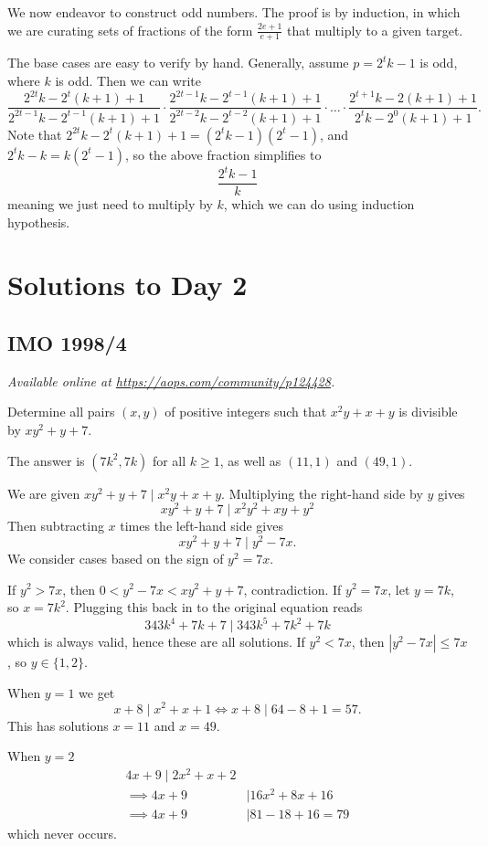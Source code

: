 \documentclass[11pt]{scrartcl}
\begin{document}
We now endeavor to construct odd numbers.
The proof is by induction, in which we are curating sets of
fractions of the form $\frac{2e+1}{e+1}$ that multiply
to a given target.

The base cases are easy to verify by hand.
Generally, assume $p = 2^t k - 1$ is odd, where $k$ is odd.
Then we can write
\[
  \frac{2^{2t}k-2^t(k+1)+1}{2^{2t-1}k-2^{t-1}(k+1)+1}
  \cdot
  \frac{2^{2t-1}k-2^{t-1}(k+1)+1}{2^{2t-2}k-2^{t-2}(k+1)+1}
  \cdot \dots \cdot
  \frac{2^{t+1}k-2(k+1)+1}{2^tk-2^0(k+1)+1}.
\]
Note that $2^{2t}k-2^t(k+1)+1 = (2^t k - 1)(2^t - 1)$,
and $2^t k - k = k(2^t-1)$, so the above fraction simplifies to
\[ \frac{2^t k - 1}{k} \]
meaning we just need to multiply by $k$,
which we can do using induction hypothesis.
\pagebreak

\section{Solutions to Day 2}
\subsection{IMO 1998/4}
\textsl{Available online at \url{https://aops.com/community/p124428}.}
\begin{mdframed}[style=mdpurplebox,frametitle={Problem statement}]
Determine all pairs $(x,y)$ of positive integers
such that $x^{2}y+x+y$ is divisible by $xy^{2}+y+7$.
\end{mdframed}
The answer is $(7k^2,7k)$ for all $k \ge 1$,
as well as $(11,1)$ and $(49,1)$.

We are given $xy^2+y+7 \mid x^2y+x+y$.
Multiplying the right-hand side by $y$ gives
\[ xy^2+y+7 \mid x^2y^2+xy+y^2 \]
Then subtracting $x$ times the left-hand side gives
\[ xy^2+y+7 \mid y^2-7x. \]
We consider cases based on the sign of $y^2=7x$.
\begin{itemize}
  \ii If $y^2 > 7x$, then $0 < y^2-7x < xy^2+y+7$,
  contradiction.
  \ii If $y^2=7x$, let $y = 7k$, so $x = 7k^2$.
  Plugging this back in to the original equation reads
  \[ 343k^4 + 7k + 7 \mid 343k^5 + 7k^2 + 7k \]
  which is always valid, hence these are all solutions.
  \ii  If $y^2 < 7x$, then $|y^2-7x| \le 7x$,
  so $y \in \{1,2\}$.

  When $y=1$ we get
  \[ x+8 \mid x^2+x+1 \iff x+8 \mid 64-8+1=57.\]
  This has solutions $x=11$ and $x=49$.

  When $y=2$
  \begin{align*}
    4x+9 \mid 2x^2+x+2 \\
    \implies 4x+9 &\mid 16x^2+8x+16 \\
    \implies 4x+9 &\mid 81-18+16 = 79
  \end{align*}
  which never occurs.
\end{itemize}
\pagebreak
\end{document}
